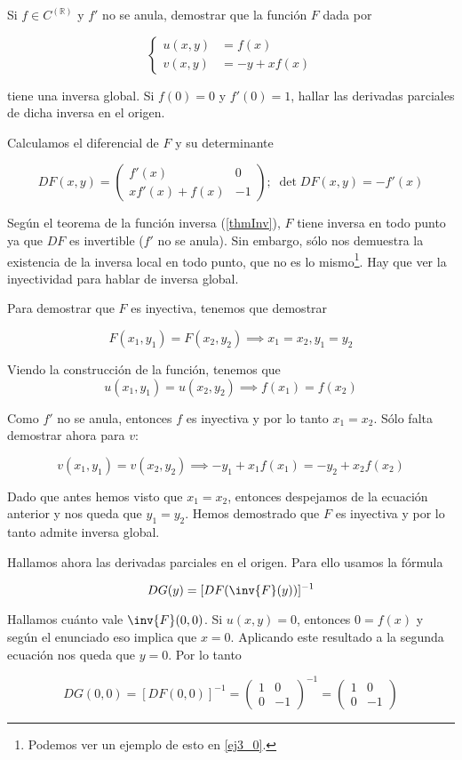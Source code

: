 \begin{problem}[5] Si $f∈C^(ℝ)$ y $f'$ no se anula, demostrar que la función $F$ dada por 

\[ \begin{cases}
u(x,y) &= f(x) \\
v(x,y) &= -y + xf(x)
\end{cases} \]

tiene una inversa global. Si $f(0)=0$ y $f'(0)=1$, hallar las derivadas parciales de dicha inversa en el origen.
\solution

Calculamos el diferencial de $F$ y su determinante

\[ DF(x,y) = \begin{pmatrix}
f'(x) & 0 \\
xf'(x) + f(x) & -1 
\end{pmatrix};\; \det DF(x,y) = -f'(x) \]

Según el teorema de la función inversa (\ref{thmInv}), $F$ tiene inversa en todo punto ya que $DF$ es invertible ($f'$ no se anula). Sin embargo, sólo nos demuestra la existencia de la inversa local en todo punto, que no es lo mismo\footnote{Podemos ver un ejemplo de esto en \ref{ej3_0}.}. Hay que ver la inyectividad para hablar de inversa global.
 
Para demostrar que $F$ es inyectiva, tenemos que demostrar 

\[ F(x_1,y_1) = F(x_2,y_2) \implies x_1=x_2, y_1=y_2 \]

Viendo la construcción de la función, tenemos que 
\[ u(x_1,y_1) = u(x_2,y_2) \implies f(x_1) = f(x_2) \]

Como $f'$ no se anula, entonces $f$ es inyectiva y por lo tanto $x_1=x_2$. Sólo falta demostrar ahora para $v$:

\[ v(x_1,y_1) = v(x_2,y_2) \implies  -y_1 + x_1f(x_1) = -y_2 + x_2f(x_2) \]

Dado que antes hemos visto que $x_1=x_2$, entonces despejamos de la ecuación anterior y nos queda que $y_1=y_2$. Hemos demostrado que $F$ es inyectiva y por lo tanto admite inversa global.

Hallamos ahora las derivadas parciales en el origen. Para ello usamos la fórmula 

\[ DG(y) = [DF(\inv{F}(y))]^{-1} \]

Hallamos cuánto vale $\inv{F}(0,0)$. Si $u(x,y) = 0$, entonces $0 = f(x)$ y según el enunciado eso implica que $x=0$. Aplicando este resultado a la segunda ecuación nos queda que $y=0$. Por lo tanto

\[ DG(0,0) = [DF(0,0)]^{-1} = \begin{pmatrix}
1 & 0 \\
0 & -1
\end{pmatrix}^{-1} = 
\begin{pmatrix}
1 & 0 \\
0 & -1
\end{pmatrix} \]

\end{problem}

